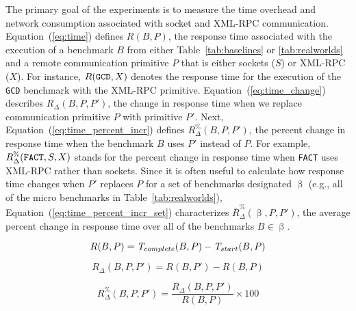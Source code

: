 \documentclass{sig-alternate}
\begin{document}



The primary goal of the experiments is to measure the time overhead
and network consumption associated with socket and XML-RPC
communication.  Equation~(\ref{eq:time}) defines $R(B,P)$, the
response time associated with the execution of a benchmark $B$ from
either Table~\ref{tab:baselines} or \ref{tab:realworlds} and a remote
communication primitive $P$ that is either sockets ($S$) or XML-RPC
($X$).  For instance, $R(\mbox{{\tt GCD}}, X)$ denotes the response
time for the execution of the {\tt GCD} benchmark with the XML-RPC
primitive.  Equation~(\ref{eq:time_change}) describes $R_\Delta
(B,P,P')$, the change in response time when we replace communication
primitive $P$ with primitive $P'$.  Next,
Equation~(\ref{eq:time_percent_incr}) defines {\small
  $R_\Delta^\%(B,P,P')$}, the percent change in response time when the
benchmark $B$ uses $P'$ instead of $P$.  For example, {\small
  $R_\Delta^\%(\mbox{{\tt FACT}},S,X)$} stands for the percent change
in response time when {\tt FACT} uses XML-RPC rather than sockets.
Since it is often useful to calculate how response time changes when
$P'$ replaces $P$ for a set of benchmarks designated $\upbeta$ (e.g.,
all of the micro benchmarks in Table~\ref{tab:realworlds}),
Equation~(\ref{eq:time_percent_incr_set}) characterizes {\small
  $\bar{R}_\Delta^\%(\upbeta,P,P')$}, the average percent change in
response time over all of the benchmarks $B \in \upbeta$.

\vspace*{-.1in}

\begin{equation} \label{eq:time}
R(B,P) = \mbox{{\em T}}_{complete}(B,P) - \mbox{{\em T}}_{start}(B,P)
\end{equation}

\vspace*{-.1in}

\begin{equation} \label{eq:time_change}
R_\Delta (B,P,P') = R(B,P') - R(B,P)
\end{equation}

\vspace*{-.1in}

\begin{equation} \label{eq:time_percent_incr}
R_\Delta^\%(B,P,P')  = \frac{R_\Delta (B,P,P')}{R(B,P)} \times 100
\end{equation}
\end{document}
